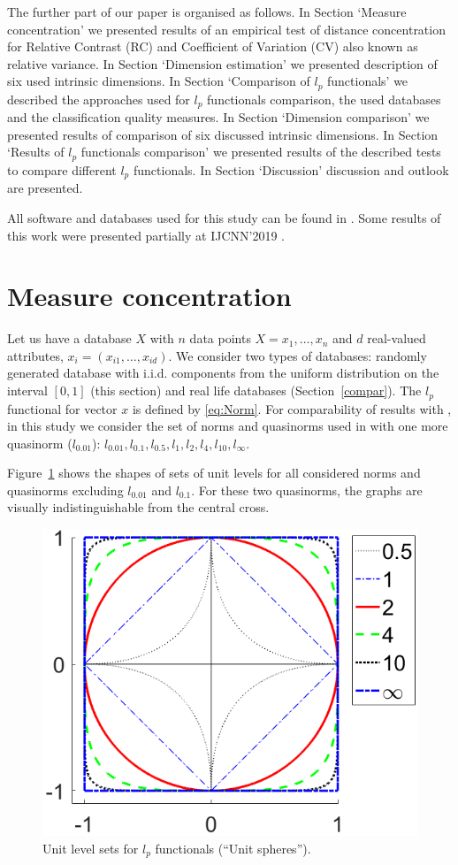 \documentclass[entropy,article,submit,moreauthors,pdftex]{Definitions/mdpi}
\begin{document}
The further part of our paper is organised as follows.
In Section `Measure concentration' we presented results of an empirical test of distance concentration for Relative Contrast (RC) and Coefficient of Variation (CV) also known as relative variance.
In Section `Dimension estimation' we presented description of six used intrinsic dimensions.
In Section `Comparison of $l_p$ functionals' we described the approaches used for $l_p$ functionals comparison, the used databases and the classification quality measures.
In Section `Dimension comparison' we presented results of comparison of six discussed intrinsic dimensions.
In Section `Results of $l_p$ functionals comparison' we presented results of the described tests to compare different $l_p$ functionals.
In Section `Discussion' discussion and outlook are presented.

All software and databases used for this study can be found in \cite{ourSoft}. Some results of this work were presented partially at IJCNN'2019 \cite{mirkes2019fractional}.


\section{Measure concentration}\label{MesConc}

Let us have a database $X$ with $n$ data points $X={x_1,\ldots,x_n}$ and $d$ real-valued attributes, $x_i=(x_{i1},\ldots,x_{id})$. We consider two types of databases: randomly generated database with i.i.d. components from the uniform distribution on the interval $[0,1]$ (this section) and real life databases (Section~\ref{compar}). The $l_p$ functional for vector $x$ is defined by \eqref{eq:Norm}. For comparability of results with \cite{aggarwal2001}, in this study we consider the set of norms and quasinorms used in \cite{aggarwal2001} with one more quasinorm ($l_{0.01}$): $l_{0.01}, l_{0.1}, l_{0.5}, l_{1}, l_{2}, l_{4}, l_{10}, l_{\infty}$.

Figure~\ref{fig:UnitCircles} shows the shapes of sets of unit levels for all considered norms and quasinorms excluding $l_{0.01}$ and $l_{0.1}$. For these two quasinorms, the graphs are visually indistinguishable from the central cross.

\begin{figure}[H]
\centerline{\includegraphics[width=0.25\columnwidth ]{UnitCircles.png}}
\caption{Unit level sets for $l_p$ functionals (``Unit spheres'').}
\label{fig:UnitCircles}
\end{figure}
\end{document}
